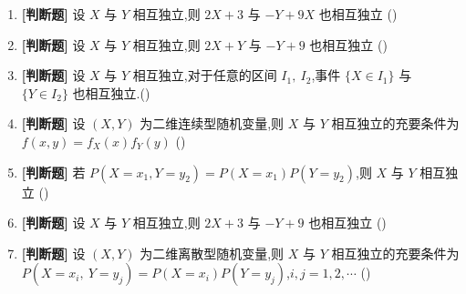 \begin{enumerate}
    \item \textbf{[判断题]} 设 $X$ 与 $Y$ 相互独立,则 $2X+3$ 与 $-Y+9X$ 也相互独立 (\quad)

    \item \textbf{[判断题]} 设 $X$ 与 $Y$ 相互独立,则 $2X+Y$ 与 $-Y+9$ 也相互独立 (\quad)

    \item \textbf{[判断题]} 设 $X$ 与 $Y$ 相互独立,对于任意的区间 $I_1,\ I_2$,事件 $\{X \in I_1\}$ 与 $\{Y \in I_2\}$ 也相互独立.(\quad)

    \item \textbf{[判断题]} 设 $(X,Y)$ 为二维连续型随机变量,则 $X$ 与 $Y$ 相互独立的充要条件为 $f(x,y)=f_X(x)f_Y(y)$ (\quad)

    \item \textbf{[判断题]} 若 $P(X=x_1,Y=y_2)=P(X=x_1)P(Y=y_2)$,则 $X$ 与 $Y$ 相互独立 (\quad)

    \item \textbf{[判断题]} 设 $X$ 与 $Y$ 相互独立,则 $2X+3$ 与 $-Y+9$ 也相互独立 (\quad)

    \item \textbf{[判断题]} 设 $(X,Y)$ 为二维离散型随机变量,则 $X$ 与 $Y$ 相互独立的充要条件为 $P(X=x_i,\ Y=y_j)=P(X=x_i)P(Y=y_j)$,$i,j=1,2,\cdots$ (\quad)


\end{enumerate}
